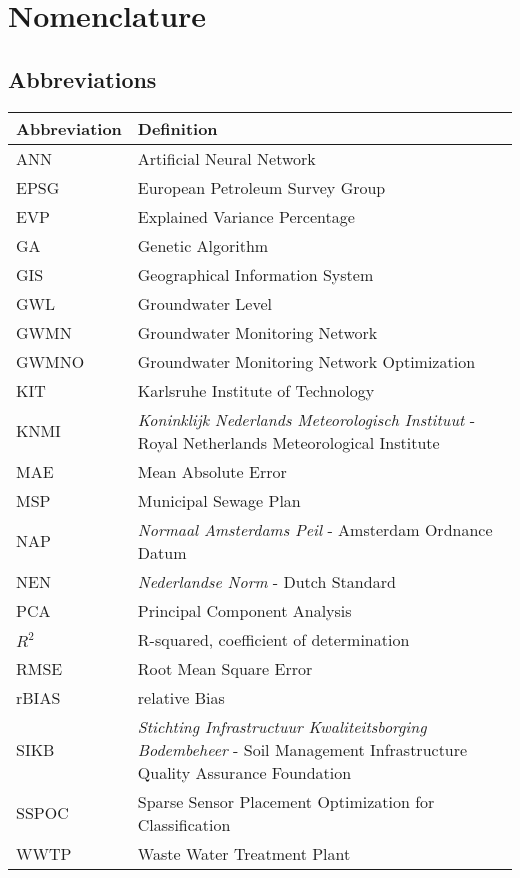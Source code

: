 \chapter*{Nomenclature}


\section*{Abbreviations}

\begin{longtable}{p{2.5cm}p{8cm}}
\toprule
Abbreviation & Definition \\
\midrule\endhead
ANN & Artificial Neural Network \\
EPSG & European Petroleum Survey Group\\
EVP & Explained Variance Percentage\\
GA & Genetic Algorithm\\
GIS & Geographical Information System\\
GWL & Groundwater Level\\
GWMN & Groundwater Monitoring Network\\
GWMNO & Groundwater Monitoring Network Optimization\\
KIT & Karlsruhe Institute of Technology\\
KNMI & \textit{Koninklijk Nederlands Meteorologisch Instituut} - Royal Netherlands Meteorological Institute\\
MAE & Mean Absolute Error\\
MSP & Municipal Sewage Plan\\
NAP & \textit{Normaal Amsterdams Peil} - Amsterdam Ordnance Datum \\
NEN & \textit{Nederlandse Norm} - Dutch Standard\\
PCA & Principal Component Analysis\\
$R^2$ & R-squared, coefficient of determination\\
RMSE & Root Mean Square Error\\
rBIAS & relative Bias\\
SIKB & \textit{Stichting Infrastructuur Kwaliteitsborging Bodembeheer} - Soil Management Infrastructure Quality Assurance Foundation\\
SSPOC & Sparse Sensor Placement Optimization for Classification\\
WWTP & Waste Water Treatment Plant\\
\bottomrule
\end{longtable}
